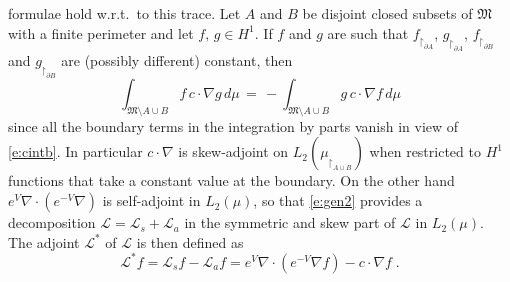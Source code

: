 \documentclass[reqno]{amsart}
\newcounter{as}[section]
\newcommand{\mc}[1]{{\mathcal #1}}
\newcommand{\mf}[1]{{\mathfrak #1}}
\newcommand{\<}{\langle}
\renewcommand{\>}{\rangle}
\begin{document}
formulae hold w.r.t.\ to this trace.
Let $A$ and $B$ be disjoint closed subsets of $\mf M$ with a finite
perimeter and let $f,\,g\in H^1$. If $f$ and $g$ are such that
$f_{\restriction_{\partial A}}$, $g_{\restriction_{\partial A}}$,
$f_{\restriction_{\partial B}}$ and $g_{\restriction_{\partial B}}$
are (possibly different) constant, then
\begin{equation}
\label{e:cintg}
\int_{\mf M\setminus {A\cup B}} f \, c\cdot \nabla g \, d\mu \,=\,
-\int_{\mf M\setminus {A\cup B}} g \,c\cdot \nabla f \, d\mu
\end{equation}
since all the boundary terms in the integration by parts vanish in
view of \eqref{e:cintb}. In particular $c \cdot \nabla$ is
skew-adjoint on $L_2(\mu_{\restriction_{A\cup B}})$ when restricted to
$H^1$ functions that take a constant value at the boundary.
On the other hand $e^V \nabla \cdot (e^{-V} \nabla)$ is self-adjoint
in $L_2(\mu)$, so that \eqref{e:gen2} provides a decomposition $\mc
L=\mc L_s+\mc L_a$ in the symmetric and skew part of $\mc L$ in
$L_2(\mu)$. The adjoint $\mc L^*$ of $\mc L$ is then defined as
\begin{equation}
\label{e:adjoint}
\mc L^* f= \mc L_sf-\mc L_a f
=e^V \nabla \cdot \left( e^{-V} \nabla f\right)- c\cdot \nabla f\;.
\end{equation}
\end{document}
